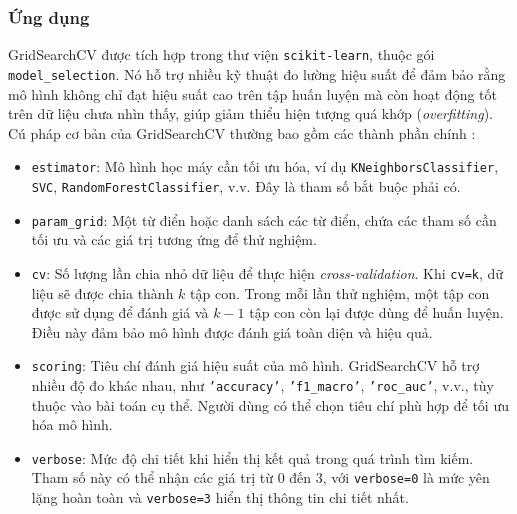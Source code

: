 \documentclass[a4paper,12pt]{article}
\begin{document}
\subsubsection{Ứng dụng} 
\hspace{5mm}GridSearchCV được tích hợp trong thư viện \texttt{scikit-learn}, thuộc gói \newline \texttt{model\_selection}. Nó hỗ trợ nhiều kỹ thuật đo lường hiệu suất để đảm bảo rằng mô hình không chỉ đạt hiệu suất cao trên tập huấn luyện mà còn hoạt động tốt trên dữ liệu chưa nhìn thấy, giúp giảm thiểu hiện tượng quá khớp (\textit{overfitting}).\\

\noindent Cú pháp cơ bản của GridSearchCV thường bao gồm các thành phần chính \cite{gridsearchcv_mygreatlearning}:
\begin{itemize}
    \item \texttt{estimator}: Mô hình học máy cần tối ưu hóa, ví dụ \texttt{KNeighborsClassifier}, \\
    \texttt{SVC}, \texttt{RandomForestClassifier}, v.v. Đây là tham số bắt buộc phải có.
    \item \texttt{param\_grid}: Một từ điển hoặc danh sách các từ điển, chứa các tham số cần tối ưu và các giá trị tương ứng để thử nghiệm.
    \item \texttt{cv}: Số lượng lần chia nhỏ dữ liệu để thực hiện \textit{cross-validation}. Khi \texttt{cv=k}, dữ liệu sẽ được chia thành \(k\) tập con. Trong mỗi lần thử nghiệm, một tập con được sử dụng để đánh giá và \(k-1\) tập con còn lại được dùng để huấn luyện. Điều này đảm bảo mô hình được đánh giá toàn diện và hiệu quả.
    \item \texttt{scoring}: Tiêu chí đánh giá hiệu suất của mô hình. GridSearchCV hỗ trợ nhiều độ đo khác nhau, như \texttt{'accuracy'}, \texttt{'f1\_macro'}, \texttt{'roc\_auc'}, v.v., tùy thuộc vào bài toán cụ thể. Người dùng có thể chọn tiêu chí phù hợp để tối ưu hóa mô hình.
    \item \texttt{verbose}: Mức độ chi tiết khi hiển thị kết quả trong quá trình tìm kiếm. Tham số này có thể nhận các giá trị từ 0 đến 3, với \texttt{verbose=0} là mức yên lặng hoàn toàn và \texttt{verbose=3} hiển thị thông tin chi tiết nhất.
\end{itemize}
\end{document}
